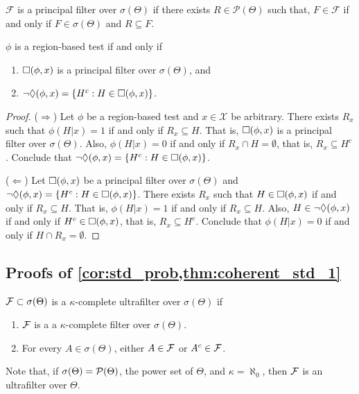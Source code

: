 \begin{definition}
 \label{def:principal-filter}
 $\mathcal{F}$ is a principal filter over $\sigma(\Theta)$
 if there exists $R \in \mathcal{P}(\Theta)$ such that,
 $F \in \mathcal{F}$ if and only if
 $F \in \sigma(\Theta)$ and $R \subseteq F$.
\end{definition}

\begin{lemma}
 \label{lemma:region-filter}
 $\phi$ is a region-based test if and only if
 \begin{enumerate}
  \item $\square({\phi,x})$ is a principal filter over $\sigma(\Theta)$, and
	\item $\lnot \Diamond({\phi,x}) = \{H^{c}: H \in \square({\phi,x})\}$.
 \end{enumerate}
\end{lemma}

\begin{proof}
 ($\Longrightarrow$) Let
 $\phi$ be a region-based test and
 $x \in \mathcal{X}$ be arbitrary.
 There exists $R_x$ such that
 $\phi(H|x) = 1$ if and only if
 $R_x \subseteq H$.
 That is, $\square({\phi,x})$ is
 a principal filter over $\sigma(\Theta)$.
 Also, $\phi(H|x) = 0$ if and only if
 $R_x \cap H = \emptyset$, that is,
 $R_x \subseteq H^c$. Conclude that
 $\lnot \Diamond({\phi,x}) = \{H^{c}: H \in \square({\phi,x})\}$.
 
 ($\Longleftarrow$) Let $\square({\phi,x})$ be a principal filter over $\sigma(\Theta)$ and $\lnot \Diamond({\phi,x}) = \{H^{c}: H \in \square({\phi,x})\}$. There exists $R_x$ such that $H \in \square({\phi,x})$ if and only if $R_x \subseteq H$. That is, $\phi(H|x) = 1$ if and only if $R_x \subseteq H$.
 Also, $H \in \lnot \Diamond({\phi,x})$ if and only if $H^c \in \square({\phi,x})$, that is, $R_x \subseteq H^c$. Conclude that $\phi(H|x) = 0$ if and only if $H \cap R_x = \emptyset$.
\end{proof}

\subsection{Proofs of \cref{cor:std_prob,thm:coherent_std_1}}

\begin{definition}
 \label{def:ultrafilter}
 $\mathcal{F} \subset \sigma(\Theta)$ is a $\kappa$-complete ultrafilter over $\sigma(\Theta)$ if
 \begin{enumerate}
  \item $\mathcal{F}$ is a a $\kappa$-complete filter over $\sigma(\Theta)$.
	\item For every $A \in \sigma(\Theta)$, 
	either $A \in \mathcal{F}$ or $A^c \in \mathcal{F}$.
 \end{enumerate}
 Note that, if $\sigma(\Theta)=\mathcal{P}(\Theta)$,
 the power set of $\Theta$, and $\kappa=\aleph_0$,
 then $\mathcal{F}$ is an ultrafilter over $\Theta$.
\end{definition}

